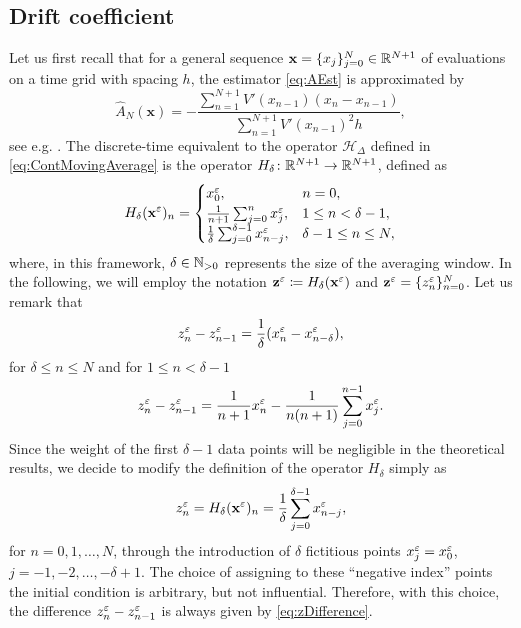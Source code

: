 \documentclass[10pt]{article}
\begin{document}
\subsection{Drift coefficient}
Let us first recall that for a general sequence $\mathbf x = \{x_j\}_{j=0}^N \in \mathbb{R}^{N+1}$ of evaluations on a time grid with spacing $h$, the estimator \eqref{eq:AEst} is approximated by
\begin{equation}\label{eq:AEstDiscrete}
	\widehat A_N(\mathbf x) = -\frac{\sum_{n=1}^{N+1} V'(x_{n-1})(x_n - x_{n-1})}{\sum_{n=1}^{N+1}V'(x_{n-1})^2 h},
\end{equation}
see e.g. \cite{PaS07}. The discrete-time equivalent to the operator $\mathcal H_\Delta$ defined in \eqref{eq:ContMovingAverage} is the operator $H_\delta\colon \mathbb{R}^{N+1} \to \mathbb{R}^{N+1}$, defined as
\begin{equation}
	H_\delta (\mathbf x^\varepsilon)_n = 
	\begin{cases}
		x^\varepsilon_0, &n = 0,\\
		\frac1{n+1} \sum_{j=0}^n x^\varepsilon_j, &1 \leq n < \delta-1,\\
		\frac1\delta \sum_{j=0}^{\delta-1} x^\varepsilon_{n-j}, &\delta - 1 \leq n \leq N,
	\end{cases} 
\end{equation}
where, in this framework, $\delta \in \mathbb{N}_{>0}$ represents the size of the averaging window. In the following, we will employ the notation $\mathbf z^\varepsilon \coloneqq H_\delta(\mathbf x^\varepsilon)$ and $\mathbf z^\varepsilon=\{z^\varepsilon_n\}_{n=0}^{N}$. Let us remark that 
\begin{equation}\label{eq:zDifference}
	z^\varepsilon_n - z^\varepsilon_{n-1} = \frac1\delta(x^\varepsilon_n - x^\varepsilon_{n-\delta}),
\end{equation}
for $\delta  \leq n \leq N$ and for $1 \leq n < \delta - 1$
\begin{equation}
	z^\varepsilon_n - z^\varepsilon_{n-1} = \frac{1}{n+1}x_n^\varepsilon - \frac1{n(n+1)} \sum_{j=0}^{n-1} x_j^\varepsilon.
\end{equation}
Since the weight of the first $\delta-1$ data points will be negligible in the theoretical results, we decide to modify the definition of the operator $H_\delta$ simply as
\begin{equation}
	z^\varepsilon_n = H_\delta (\mathbf x^\varepsilon)_n = \frac1\delta \sum_{j=0}^{\delta-1} x^\varepsilon_{n-j},
\end{equation}
for $n = 0, 1, \ldots, N$, through the introduction of $\delta$ fictitious points $x^\varepsilon_j = x^\varepsilon_0$, $j = -1, -2, \ldots, -\delta+1$. The choice of assigning to these ``negative index'' points the initial condition is arbitrary, but not influential. Therefore, with this choice, the difference $z_n^\varepsilon - z_{n-1}^\varepsilon$ is always given by \eqref{eq:zDifference}.
\end{document}
